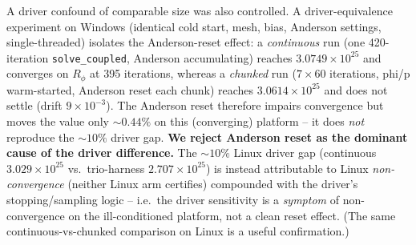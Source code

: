 \documentclass[11pt]{article}
\newcommand{\ten}[1]{\times 10^{#1}}
\begin{document}
A driver confound of comparable size was also controlled. A driver-equivalence experiment on Windows (identical cold start, mesh, bias, Anderson settings, single-threaded) isolates the Anderson-reset effect: a \emph{continuous} run (one 420-iteration \texttt{solve\_coupled}, Anderson accumulating) reaches $3.0749\ten{25}$ and converges on $R_\phi$ at 395 iterations, whereas a \emph{chunked} run ($7\times60$ iterations, phi/p warm-started, Anderson reset each chunk) reaches $3.0614\ten{25}$ and does not settle (drift $9\ten{-3}$). The Anderson reset therefore impairs convergence but moves the value only $\sim0.44\%$ on this (converging) platform -- it does \emph{not} reproduce the $\sim10\%$ driver gap. \textbf{We reject Anderson reset as the dominant cause of the driver difference.} The $\sim10\%$ Linux driver gap (continuous $3.029\ten{25}$ vs.\ trio-harness $2.707\ten{25}$) is instead attributable to Linux \emph{non-convergence} (neither Linux arm certifies) compounded with the driver's stopping/sampling logic -- i.e.\ the driver sensitivity is a \emph{symptom} of non-convergence on the ill-conditioned platform, not a clean reset effect. (The same continuous-vs-chunked comparison on Linux is a useful confirmation.)
\end{document}
